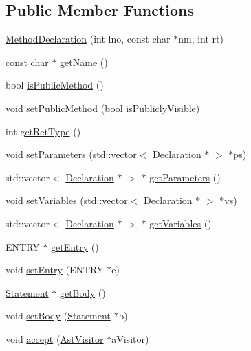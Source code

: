 \subsection*{Public Member Functions}
\begin{DoxyCompactItemize}
\item 
\hyperlink{classMethodDeclaration_ae1ac6dc291290fc20f067360e275d3bb}{MethodDeclaration} (int lno, const char $\ast$nm, int rt)
\item 
const char $\ast$ \hyperlink{classMethodDeclaration_a792d1e64f2126f6daca537cb85e5ae6e}{getName} ()
\item 
bool \hyperlink{classMethodDeclaration_ac857d555077d6b35696470fd33f9315c}{isPublicMethod} ()
\item 
void \hyperlink{classMethodDeclaration_ad22630f0023935de4f76b0f399633ede}{setPublicMethod} (bool isPubliclyVisible)
\item 
int \hyperlink{classMethodDeclaration_ab26bfa7db28f171f2a25dacefd5141bf}{getRetType} ()
\item 
void \hyperlink{classMethodDeclaration_a82bce812810c881e6f1dca61b5b631ff}{setParameters} (std::vector$<$ \hyperlink{classDeclaration}{Declaration} $\ast$ $>$ $\ast$ps)
\item 
std::vector$<$ \hyperlink{classDeclaration}{Declaration} $\ast$ $>$ $\ast$ \hyperlink{classMethodDeclaration_ae57ec0b65b1edcaa7c6ddf5a08304886}{getParameters} ()
\item 
void \hyperlink{classMethodDeclaration_ad65f55276d3ea08cc0156a8a4eb3e035}{setVariables} (std::vector$<$ \hyperlink{classDeclaration}{Declaration} $\ast$ $>$ $\ast$vs)
\item 
std::vector$<$ \hyperlink{classDeclaration}{Declaration} $\ast$ $>$ $\ast$ \hyperlink{classMethodDeclaration_a4078ee50432bfa957007584cf6f3f260}{getVariables} ()
\item 
ENTRY $\ast$ \hyperlink{classMethodDeclaration_ab32ff62da9f19c145ad13f811b97b265}{getEntry} ()
\item 
void \hyperlink{classMethodDeclaration_aa786d4c52123cf501a85f2e3604f7cb6}{setEntry} (ENTRY $\ast$e)
\item 
\hyperlink{classStatement}{Statement} $\ast$ \hyperlink{classMethodDeclaration_a7c7b3d34df4197370caca80119f19c0f}{getBody} ()
\item 
void \hyperlink{classMethodDeclaration_a0ba428c0491f39c66a6b26d24077b56c}{setBody} (\hyperlink{classStatement}{Statement} $\ast$b)
\item 
void \hyperlink{classMethodDeclaration_af4989b6bfa1fdc87be33f4315aa54a7e}{accept} (\hyperlink{classAstVisitor}{AstVisitor} $\ast$aVisitor)
\end{DoxyCompactItemize}


